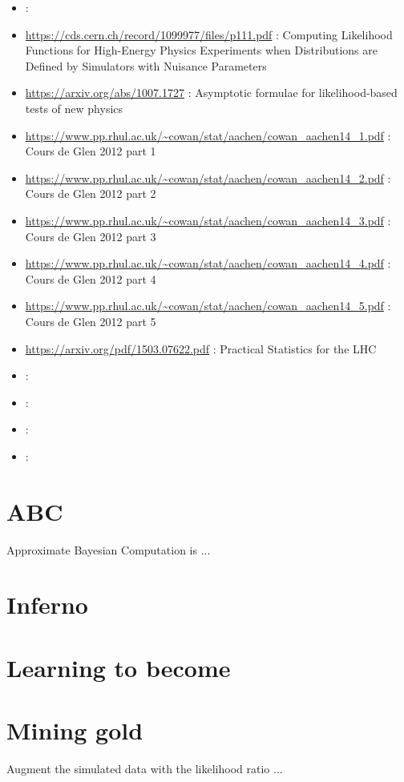\begin{itemize}
    \item \url{} : 
    \item \url{https://cds.cern.ch/record/1099977/files/p111.pdf} : Computing Likelihood Functions for High-Energy Physics Experiments when Distributions are Defined by Simulators with Nuisance Parameters
    \item \url{https://arxiv.org/abs/1007.1727} : Asymptotic formulae for likelihood-based tests of new physics
    \item \url{https://www.pp.rhul.ac.uk/~cowan/stat/aachen/cowan_aachen14_1.pdf} : Cours de Glen 2012 part 1
    \item \url{https://www.pp.rhul.ac.uk/~cowan/stat/aachen/cowan_aachen14_2.pdf} : Cours de Glen 2012 part 2
    \item \url{https://www.pp.rhul.ac.uk/~cowan/stat/aachen/cowan_aachen14_3.pdf} : Cours de Glen 2012 part 3
    \item \url{https://www.pp.rhul.ac.uk/~cowan/stat/aachen/cowan_aachen14_4.pdf} : Cours de Glen 2012 part 4
    \item \url{https://www.pp.rhul.ac.uk/~cowan/stat/aachen/cowan_aachen14_5.pdf} : Cours de Glen 2012 part 5
    \item \url{https://arxiv.org/pdf/1503.07622.pdf} : Practical Statistics for the LHC
    \item \url{} : 
    \item \url{} : 
    \item \url{} : 
    \item \url{} : 
\end{itemize}


\section{ ABC }

Approximate Bayesian Computation is ...

\section{ Inferno }
\section{ Learning to become }

\section{ Mining gold }

Augment the simulated data with the likelihood ratio ...





